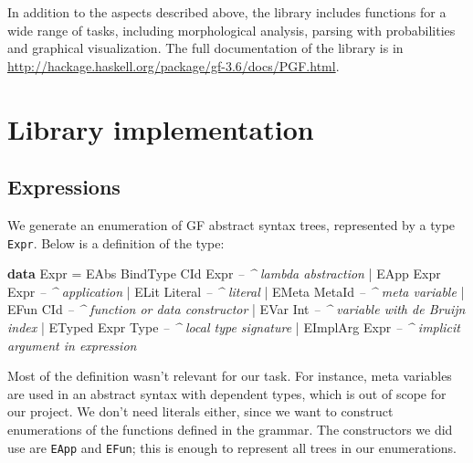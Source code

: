 \documentclass[]{article}
\newenvironment{Shaded}{\begin{snugshade}}{\end{snugshade}}
\newcommand{\KeywordTok}[1]{\textcolor[rgb]{0.13,0.29,0.53}{\textbf{{#1}}}}
\newcommand{\DataTypeTok}[1]{\textcolor[rgb]{0.13,0.29,0.53}{{#1}}}
\newcommand{\CommentTok}[1]{\textcolor[rgb]{0.56,0.35,0.01}{\textit{{#1}}}}
\newcommand{\FunctionTok}[1]{\textcolor[rgb]{0.00,0.00,0.00}{{#1}}}
\begin{document}
In addition to the aspects described above, the library includes
functions for a wide range of tasks, including morphological analysis,
parsing with probabilities and graphical visualization. The full
documentation of the library is in
\href{hackage.haskell.org/package/gf-3.6/docs/PGF.html}{http://hackage.haskell.org/package/gf-3.6/docs/PGF.html}.

\section{Library implementation}\label{library-implementation}

\subsection{Expressions}\label{expressions}

We generate an enumeration of GF abstract syntax trees, represented by a
type \texttt{Expr}. Below is a definition of the type:

\begin{Shaded}
\begin{Highlighting}[]
\KeywordTok{data} \DataTypeTok{Expr} \FunctionTok{=}
   \DataTypeTok{EAbs} \DataTypeTok{BindType} \DataTypeTok{CId} \DataTypeTok{Expr}       \CommentTok{-- ^ lambda abstraction}
 \FunctionTok{|} \DataTypeTok{EApp} \DataTypeTok{Expr} \DataTypeTok{Expr}               \CommentTok{-- ^ application}
 \FunctionTok{|} \DataTypeTok{ELit} \DataTypeTok{Literal}                 \CommentTok{-- ^ literal}
 \FunctionTok{|} \DataTypeTok{EMeta}  \DataTypeTok{MetaId}                \CommentTok{-- ^ meta variable}
 \FunctionTok{|} \DataTypeTok{EFun}   \DataTypeTok{CId}                   \CommentTok{-- ^ function or data constructor}
 \FunctionTok{|} \DataTypeTok{EVar}   \DataTypeTok{Int}                   \CommentTok{-- ^ variable with de Bruijn index}
 \FunctionTok{|} \DataTypeTok{ETyped} \DataTypeTok{Expr} \DataTypeTok{Type}             \CommentTok{-- ^ local type signature}
 \FunctionTok{|} \DataTypeTok{EImplArg} \DataTypeTok{Expr}                \CommentTok{-- ^ implicit argument in expression}
\end{Highlighting}
\end{Shaded}

Most of the definition wasn't relevant for our task. For instance, meta
variables are used in an abstract syntax with dependent types, which is
out of scope for our project. We don't need literals either, since we
want to construct enumerations of the functions defined in the grammar.
The constructors we did use are \texttt{EApp} and \texttt{EFun}; this is
enough to represent all trees in our enumerations.
\end{document}
